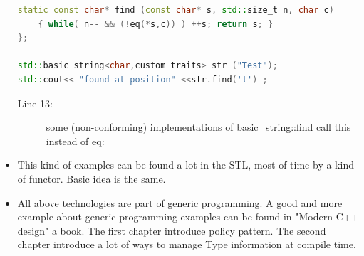 \documentclass[a4paper,11pt,twoside]{book}
\begin{document}
\begin{itemize}
\begin{lstlisting}[frame=single, language=c++]
static const char* find (const char* s, std::size_t n, char c)
	{ while( n-- && (!eq(*s,c)) ) ++s; return s; }
};
	
std::basic_string<char,custom_traits> str ("Test");
std::cout<< "found at position" <<str.find('t') ;
\end{lstlisting}
\begin{description}
	\item[Line 13:] some (non-conforming) implementations of basic\_string::find call this instead of eq:
\end{description}

	
	\item This kind of examples can be found a lot in the STL, most of time by a kind of functor. Basic idea is the same.
	
	\item All above technologies are part of generic programming. A good and more example about generic programming examples can be found in "Modern C++ design" a book. The first chapter introduce policy pattern. The second chapter introduce a lot of ways to manage Type information at compile time. 
	
\end{itemize}
\end{document}
